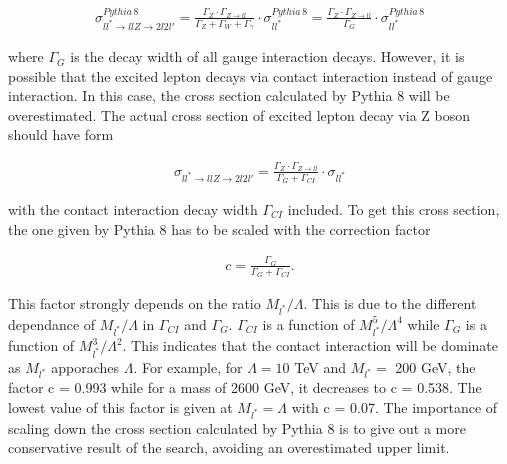 \begin{align}
  \sigma_{ll^{*}\rightarrow llZ\rightarrow 2l2l'}^{Pythia\,8} = \frac{\Gamma_{Z}\cdot \Gamma_{Z\rightarrow ll}}{\Gamma_{Z} + \Gamma_{W} + \Gamma_{\gamma}} \cdot \sigma_{ll^{*}}^{Pythia\,8} = \frac{\Gamma_{Z}\cdot \Gamma_{Z\rightarrow ll}}{\Gamma_{G}} \cdot \sigma_{ll^{*}}^{Pythia\,8}
\end{align}

\noindent where $\Gamma_{G}$ is the decay width of all gauge interaction decays. However, it is possible that the excited lepton decays via contact interaction instead of gauge interaction. In this case, the cross section calculated by Pythia 8 will be overestimated. The actual cross section of excited lepton decay via Z boson should have form  

\begin{align}
  \sigma_{ll^{*}\rightarrow llZ\rightarrow 2l2l'} = \frac{\Gamma_{Z}\cdot \Gamma_{Z\rightarrow ll}}{\Gamma_{G} + \Gamma_{CI}} \cdot \sigma_{ll^{*}}
\end{align}

\noindent with the contact interaction decay width $\Gamma_{CI}$ included. To get this cross section, the one given by Pythia 8 has to be scaled with the correction factor

\begin{align}
  c = \frac{\Gamma_{G}}{\Gamma_{G} + \Gamma_{CI}}.
\end{align}

\noindent This factor strongly depends on the ratio $M_{l^{*}} / \Lambda$. This is due to the different dependance of $M_{l^{*}} / \Lambda$ in $\Gamma_{CI}$ and $\Gamma_{G}$. $\Gamma_{CI}$ is a function of $M_{l^{*}}^{5} / \Lambda^{4}$ while $\Gamma_{G}$ is a function of $M_{l^{*}}^{3} / \Lambda^{2}$. This indicates that the contact interaction will be dominate as $M_{l^{*}}$ apporaches $\Lambda$. For example, for $\Lambda = 10$ TeV and $M_{l^{*}} =$ 200 GeV, the factor c = 0.993 while for a mass of 2600 GeV, it decreases to c = 0.538. The lowest value of this factor is given at $M_{l^{*}} = \Lambda$ with c = 0.07. The importance of scaling down the cross section calculated by Pythia 8 is to give out a more conservative result of the search, avoiding an overestimated upper limit. 


